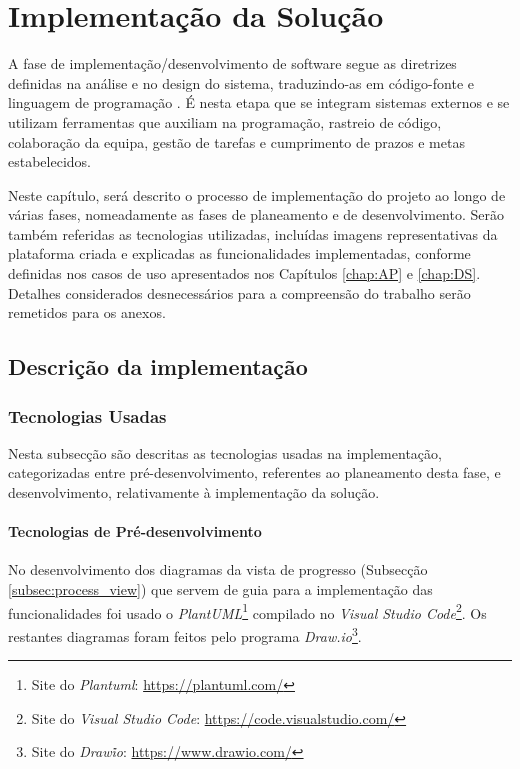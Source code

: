 % 
\chapter{Implementação da Solução} 
\label{chap:Impl}

A fase de implementação/desenvolvimento de software segue as diretrizes definidas na análise e no design do sistema, traduzindo-as em código-fonte e linguagem de programação \cite{UBIMINDS2025}. É nesta etapa que se integram sistemas externos e se utilizam ferramentas que auxiliam na programação, rastreio de código, colaboração da equipa, gestão de tarefas e cumprimento de prazos e metas estabelecidos.

Neste capítulo, será descrito o processo de implementação do projeto ao longo de várias fases, nomeadamente as fases de planeamento e de desenvolvimento. Serão também referidas as tecnologias utilizadas, incluídas imagens representativas da plataforma criada e explicadas as funcionalidades implementadas, conforme definidas nos casos de uso apresentados nos Capítulos \ref{chap:AP} e \ref{chap:DS}. Detalhes considerados desnecessários para a compreensão do trabalho serão remetidos para os anexos.


\section{Descrição da implementação} 
\label{sec:desc}

\subsection{Tecnologias Usadas}

Nesta subsecção são descritas as tecnologias usadas na implementação, categorizadas entre pré-desenvolvimento, referentes ao planeamento desta fase, e desenvolvimento, relativamente à implementação da solução.

\subsubsection{Tecnologias de Pré-desenvolvimento}

No desenvolvimento dos diagramas da vista de progresso (Subsecção \ref{subsec:process_view}) que servem de guia para a implementação das funcionalidades foi usado o \textit{PlantUML}\footnote{Site do \textit{Plantuml}: \url{https://plantuml.com/}} compilado no \textit{Visual Studio Code}\footnote{Site do \textit{Visual Studio Code}: \url{https://code.visualstudio.com/}}. Os restantes diagramas foram feitos pelo programa \textit{Draw.io}\footnote{Site do \textit{Draw\.io}: \url{https://www.drawio.com/}}.

